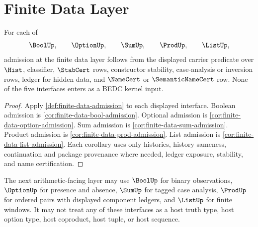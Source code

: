 \section{Finite Data Layer}
\label{sec:finite-data-layer-admission}

\begin{theorem}
\label{thm:finite-data-layer-admission}
For each of
$$
\BoolUp,\qquad
\OptionUp,\qquad
\SumUp,\qquad
\ProdUp,\qquad
\ListUp,
$$
admission at the finite data layer follows from the displayed carrier
predicate over $\Hist$, classifier, $\StabCert$ rows, constructor stability,
case-analysis or inversion rows, ledger for hidden data, and $\NameCert$ or
$\SemanticNameCert$ row.  None of the five interfaces enters as a BEDC
kernel input.
\end{theorem}

\begin{proof}
Apply \autoref{def:finite-data-admission} to each displayed interface.
Boolean admission is \autoref{cor:finite-data-bool-admission}.  Optional
admission is \autoref{cor:finite-data-option-admission}.  Sum admission is
\autoref{cor:finite-data-sum-admission}.  Product admission is
\autoref{cor:finite-data-prod-admission}.  List admission is
\autoref{cor:finite-data-list-admission}.  Each corollary uses only
histories, history sameness, continuation and package provenance where
needed, ledger exposure, stability, and name certification.
\end{proof}

\begin{principle}
\label{prin:finite-data-arithmetic-boundary}
The next arithmetic-facing layer may use $\BoolUp$ for binary
observations, $\OptionUp$ for presence and absence, $\SumUp$ for tagged
case analysis, $\ProdUp$ for ordered pairs with displayed component
ledgers, and $\ListUp$ for finite windows.  It may not treat any of these
interfaces as a host truth type, host option type, host coproduct, host
tuple, or host sequence.
\end{principle}
